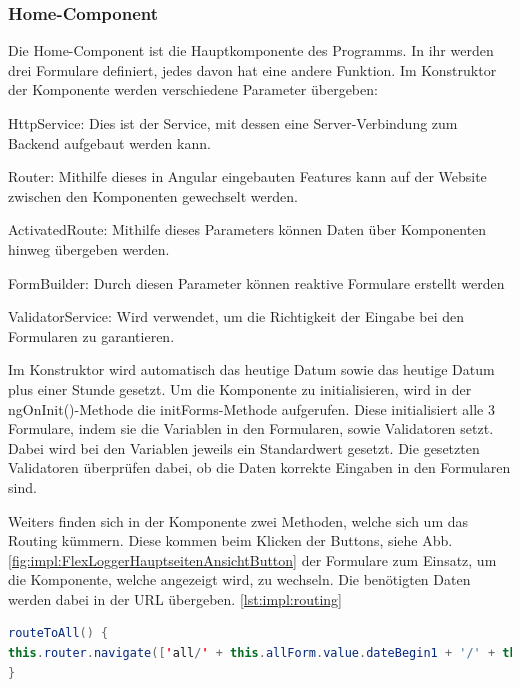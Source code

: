 \subsubsection{Home-Component}
Die Home-Component ist die Hauptkomponente des Programms. In ihr werden drei Formulare definiert, jedes davon hat eine andere Funktion. Im Konstruktor der Komponente werden verschiedene Parameter übergeben:


\begin{compactitem}
\item HttpService: Dies ist der Service, mit dessen eine Server-Verbindung zum Backend aufgebaut werden kann.
\item Router: Mithilfe dieses in Angular eingebauten Features kann auf der Website zwischen den Komponenten gewechselt werden.
\item ActivatedRoute: Mithilfe dieses Parameters können Daten über Komponenten hinweg übergeben werden.
\item FormBuilder: Durch diesen Parameter können reaktive Formulare erstellt werden
\item ValidatorService: Wird verwendet, um die Richtigkeit der Eingabe bei den Formularen zu garantieren.
\end{compactitem}


Im Konstruktor wird automatisch das heutige Datum sowie das heutige Datum plus einer Stunde gesetzt.
Um die Komponente zu initialisieren, wird in der ngOnInit()-Methode die initForms-Methode aufgerufen. Diese initialisiert alle 3 Formulare, indem sie die Variablen in den Formularen, sowie Validatoren setzt. Dabei wird bei den Variablen jeweils ein Standardwert gesetzt. Die gesetzten Validatoren überprüfen dabei, ob die Daten korrekte Eingaben in den Formularen sind.


Weiters finden sich in der Komponente zwei Methoden, welche sich um das Routing kümmern. Diese kommen beim Klicken der Buttons, siehe Abb. \ref{fig:impl:FlexLoggerHauptseitenAnsichtButton} der Formulare zum Einsatz, um die Komponente, welche angezeigt wird, zu wechseln. Die benötigten Daten werden dabei in der URL übergeben. \ref{lst:impl:routing}



\begin{lstlisting}[language=java,caption=Routing zu anderer Komponente,label=lst:impl:routing]
routeToAll() {
this.router.navigate(['all/' + this.allForm.value.dateBegin1 + '/' + this.allForm.value.timeBegin1 + '/' + this.allForm.value.dateEnd1 + '/' + this.allForm.value.timeEnd1], {relativeTo: this.route});
}
\end{lstlisting}




